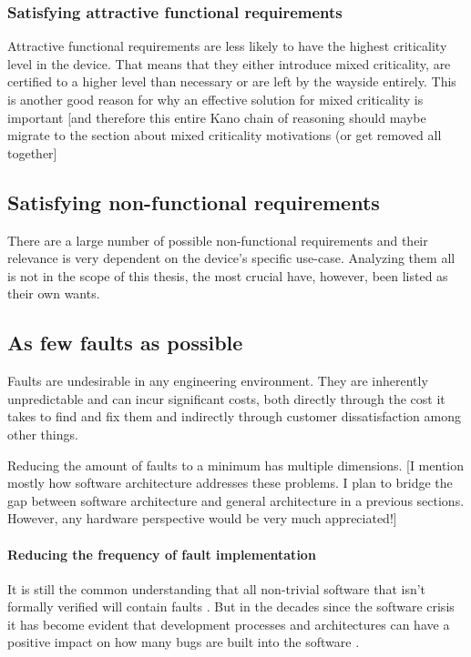 \subsubsection{Satisfying attractive functional requirements}
Attractive functional requirements are less likely to have the highest criticality level in the device. That means that they either introduce mixed criticality, are certified to a higher level than necessary or are left by the wayside entirely. This is another good reason for why an effective solution for mixed criticality is important [and therefore this entire Kano chain of reasoning should maybe migrate to the section about mixed criticality motivations (or get removed all together]
\subsection{Satisfying non-functional requirements}
There are a large number of possible non-functional requirements and their relevance is very dependent on the device's specific use-case. Analyzing them all is not in the scope of this thesis, the most crucial have, however, been listed as their own wants. 

\subsection{As few faults as possible}
Faults are undesirable in any engineering environment. They are inherently unpredictable and can incur significant costs, both directly through the cost it takes to find and fix them and indirectly through customer dissatisfaction among other things.

Reducing the amount of faults to a minimum has multiple dimensions. 
[I mention mostly how software architecture addresses these problems. I plan to bridge the gap between software architecture and general architecture in a previous sections. However, any hardware perspective would be very much appreciated!]
\paragraph{Reducing the frequency of fault implementation}
It is still the common understanding that all non-trivial software that isn't formally verified will contain faults \cite{Klein.2009}. But in the decades since the software crisis it has become evident that development processes and architectures can have a positive impact on how many bugs are built into the software \cite{Randell.1996}.  
